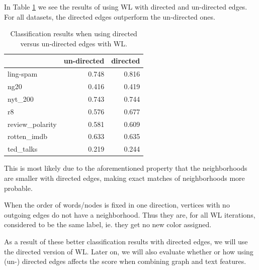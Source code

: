 In Table \ref{table:results_directed_vs_undirected} we see the results of using WL with directed and un-directed edges.
For all datasets, the directed edges outperform the un-directed ones.

\begin{table}[htb!]
	\centering
\begin{tabular}{lrr}
	 &  un-directed & directed \\
	\midrule
ling-spam       & 0.748 & 0.816 \\
ng20            & 0.416 & 0.419 \\
nyt\_200         & 0.743 & 0.744 \\
r8              & 0.576 & 0.677 \\
review\_polarity & 0.581 & 0.609 \\
rotten\_imdb     & 0.633 & 0.635 \\
ted\_talks       & 0.219 & 0.244 \\
	\bottomrule
\end{tabular}
\caption[Results: WL with directed and un-directed edges]{Classification results when using directed versus un-directed edges with WL.}\label{table:results_directed_vs_undirected}
\end{table}

This is most likely due to the aforementioned property that the neighborhoods are smaller with directed edges, making exact matches of neighborhoods more probable.

When the order of words/nodes is fixed in one direction, vertices with no outgoing edges do not have a neighborhood. Thus they are, for all WL iterations, considered to be the same label, ie. they get no new color assigned.

As a result of these better classification results with directed edges, we will use the directed version of WL.
Later on, we will also evaluate whether or how using (un-) directed edges affects the score when combining graph and text features.



